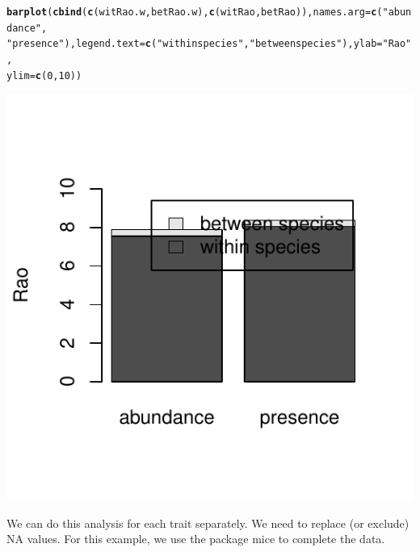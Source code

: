 \documentclass[12pt]{article}\usepackage[]{graphicx}\usepackage[]{color}
\makeatletter
\def\maxwidth{ %
  \ifdim\Gin@nat@width>\linewidth
    \linewidth
  \else
    \Gin@nat@width
  \fi
}
\newcommand{\hlnum}[1]{\textcolor[rgb]{0.686,0.059,0.569}{#1}}%
\newcommand{\hlstr}[1]{\textcolor[rgb]{0.192,0.494,0.8}{#1}}%
\newcommand{\hlstd}[1]{\textcolor[rgb]{0.345,0.345,0.345}{#1}}%
\newcommand{\hlkwc}[1]{\textcolor[rgb]{0.333,0.667,0.333}{#1}}%
\newcommand{\hlkwd}[1]{\textcolor[rgb]{0.737,0.353,0.396}{\textbf{#1}}}%
\newenvironment{kframe}{%
 \def\at@end@of@kframe{}%
 \ifinner\ifhmode%
  \def\at@end@of@kframe{\end{minipage}}%
  \begin{minipage}{\columnwidth}%
 \fi\fi%
 \def\FrameCommand##1{\hskip\@totalleftmargin \hskip-\fboxsep
 \colorbox{shadecolor}{##1}\hskip-\fboxsep
     \hskip-\linewidth \hskip-\@totalleftmargin \hskip\columnwidth}%
 \MakeFramed {\advance\hsize-\width
   \@totalleftmargin\z@ \linewidth\hsize
   \@setminipage}}%
 {\par\unskip\endMakeFramed%
 \at@end@of@kframe}
\newenvironment{knitrout}{}{} %
\makeatother
\begin{document}
\begin{knitrout}
\color{fgcolor}\begin{kframe}
\begin{alltt}
\hlkwd{barplot}\hlstd{(}\hlkwd{cbind}\hlstd{(}\hlkwd{c}\hlstd{(witRao.w, betRao.w),} \hlkwd{c}\hlstd{(witRao, betRao)),} \hlkwc{names.arg} \hlstd{=} \hlkwd{c}\hlstd{(}\hlstr{"abundance"}\hlstd{,}
    \hlstr{"presence"}\hlstd{),} \hlkwc{legend.text} \hlstd{=} \hlkwd{c}\hlstd{(}\hlstr{"within species"}\hlstd{,} \hlstr{"between species"}\hlstd{),} \hlkwc{ylab} \hlstd{=} \hlstr{"Rao"}\hlstd{,}
    \hlkwc{ylim} \hlstd{=} \hlkwd{c}\hlstd{(}\hlnum{0}\hlstd{,} \hlnum{10}\hlstd{))}
\end{alltt}
\end{kframe}

{\centering \includegraphics[width=\maxwidth]{figure/unnamed-chunk-10} 

}



\end{knitrout}


We can do this analysis for each trait separately. We need to replace (or exclude) NA values. For this example, we use the package mice to complete the data.
\end{document}
